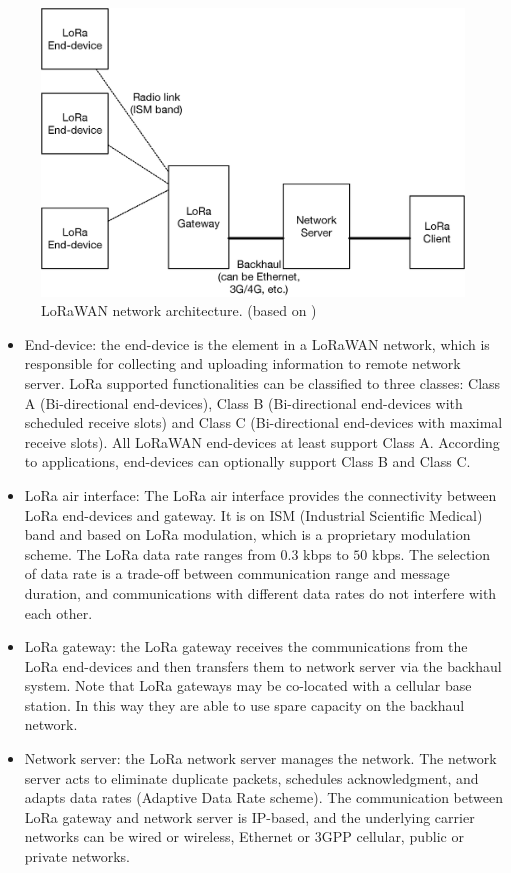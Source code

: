 \begin{figure}[!t]
	\centering
	\includegraphics[width=0.8\linewidth]{Chapter2/Figures/LoRa-net-arch.eps}
	\caption{LoRaWAN network architecture. (based on \cite{lora/specification})}
	\label{fig:lora-net-arch}
\end{figure}
\begin{itemize}[leftmargin=*]
	\item End-device: the end-device is the element in a LoRaWAN network, which is responsible for collecting and uploading information to remote network server. LoRa supported functionalities can be classified to three classes: Class A (Bi-directional end-devices), Class B (Bi-directional end-devices with scheduled receive slots) and Class C (Bi-directional end-devices with maximal receive slots). All LoRaWAN end-devices at least support Class A. According to applications, end-devices can optionally support Class B and Class C.
	\item LoRa air interface: The LoRa air interface provides the connectivity between LoRa end-devices and gateway. It is on ISM (Industrial Scientific Medical) band and based on LoRa modulation, which is a proprietary modulation scheme. The LoRa data rate ranges from $0.3$ kbps to $50$ kbps. The selection of data rate is a trade-off between
	communication range and message duration, and communications with different data rates do
	not interfere with each other. 
	\item LoRa gateway: the LoRa gateway receives the communications from the LoRa end-devices and then transfers them to network server via the backhaul system. Note that LoRa gateways may be co-located with a cellular base station. In this way they are able to use spare capacity on the backhaul network.
	\item Network server:  the LoRa network server manages the network. The network server acts to eliminate duplicate packets, schedules acknowledgment, and adapts data rates (Adaptive Data Rate scheme). The communication between LoRa gateway and network server is IP-based, and the underlying carrier networks can be wired or wireless,  Ethernet or 3GPP cellular, public or private networks.
\end{itemize}

